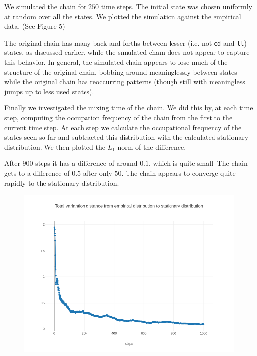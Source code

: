 \documentclass[10pt]{article}
\begin{document}
We simulated the chain for $250$ time steps. The initial state was chosen
uniformly at random over all the states. We plotted the simulation against the
empirical data. (See Figure 5)

The original chain has many back and forths between lesser (i.e. not \texttt{cd}
and \texttt{ll}) states, as discussed earlier, while the simulated chain does
not appear to capture this behavior. In general, the simulated chain appears to
lose much of the structure of the original chain, bobbing around meaninglessly
between states while the original chain has reoccurring patterns (though still
with meaningless jumps up to less used states).

Finally we investigated the mixing time of the chain. We did this by, at each
time step, computing the occupation frequency of the chain from the first to the
current time step. At each step we calculate the occupational frequency of the
states seen so far and subtracted this distribution with the calculated
stationary distribution. We then plotted the $L_1$ norm of the difference.

After $900$ steps it has a difference of around $0.1$, which is quite small. The
chain gets to a difference of $0.5$ after only $50$. The chain appears to
converge quite rapidly to the stationary distribution.

\begin{figure}[!htb]
  \centering
  \includegraphics[scale=.45]{../pictures/mixing-time-analysis.png}
  \caption{}
\end{figure}

\clearpage
\end{document}
